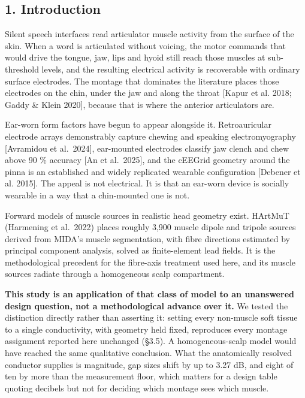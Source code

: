 \documentclass[
  11pt,
  a4paper,
]{article}
\begin{document}
\begin{abstract}
\textbf{Significance.} For device design the result is one-sided, not a trade: a
retroauricular montage loses lip and chin activity entirely and buys no muscle
back reliably in exchange. What remains a design lever is placement, a four-site
cluster chosen by anatomical target beats an arbitrary draw from the same
candidates. The homogeneous-conductor control locates what anatomical detail is
needed for --- montage assignment is recoverable without it, magnitudes are not.


\end{abstract}

\subsection{1. Introduction}\label{introduction}

Silent speech interfaces read articulator muscle activity from the surface of
the skin. When a word is articulated without voicing, the motor commands that
would drive the tongue, jaw, lips and hyoid still reach those muscles at
sub-threshold levels, and the resulting electrical activity is recoverable with
ordinary surface electrodes. The montage that dominates the literature places
those electrodes on the chin, under the jaw and along the throat {[}Kapur et al.
2018; Gaddy \& Klein 2020{]}, because that is where the anterior articulators are.

Ear-worn form factors have begun to appear alongside it. Retroauricular
electrode arrays demonstrably capture chewing and speaking electromyography
{[}Avramidou et al.~2024{]}, ear-mounted electrodes classify jaw clench and chew
above 90 \% accuracy {[}An et al.~2025{]}, and the cEEGrid geometry around the pinna
is an established and widely replicated wearable configuration {[}Debener et al.
2015{]}. The appeal is not electrical. It is that an ear-worn device is socially
wearable in a way that a chin-mounted one is not.

Forward models of muscle sources in realistic head geometry exist. HArtMuT
(Harmening et al.~2022) places roughly 3,900 muscle dipole and tripole sources
derived from MIDA's muscle segmentation, with fibre directions estimated by
principal component analysis, solved as finite-element lead fields. It is the
methodological precedent for the fibre-axis treatment used here, and its
muscle sources radiate through a homogeneous scalp compartment.

\textbf{This study is an application of that class of model to an unanswered design
question, not a methodological advance over it.} We tested the distinction
directly rather than asserting it: setting every non-muscle soft tissue to a
single conductivity, with geometry held fixed, reproduces every montage
assignment reported here unchanged (\S{}3.5). A homogeneous-scalp model would
have reached the same qualitative conclusion. What the anatomically resolved
conductor supplies is magnitude, gap sizes shift by up to 3.27 dB, and eight
of ten by more than the measurement floor, which matters for a design table
quoting decibels but not for deciding which montage sees which muscle.
\end{document}
